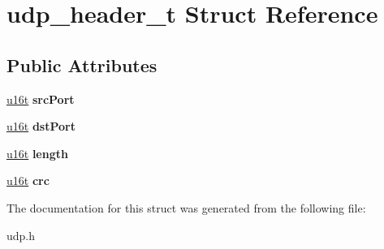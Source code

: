 \hypertarget{structudp__header__t}{}\section{udp\+\_\+header\+\_\+t Struct Reference}
\label{structudp__header__t}
\subsection*{Public Attributes}
\begin{DoxyCompactItemize}
\item 
\mbox{\label{structudp__header__t_a75c64ae2804e9f789e157e914eef7f59}} 
\hyperlink{macros_8h_a590a9a8f7df8fabfac6573e21da1922d}{u16t} {\bfseries src\+Port}
\item 
\mbox{\label{structudp__header__t_a2bd45c541cea7ceba3a45dd50c06f6a3}} 
\hyperlink{macros_8h_a590a9a8f7df8fabfac6573e21da1922d}{u16t} {\bfseries dst\+Port}
\item 
\mbox{\label{structudp__header__t_a2525804fef03fb73295d27ee6ada737b}} 
\hyperlink{macros_8h_a590a9a8f7df8fabfac6573e21da1922d}{u16t} {\bfseries length}
\item 
\mbox{\label{structudp__header__t_a60927678afdb28e824ce916f8299bd01}} 
\hyperlink{macros_8h_a590a9a8f7df8fabfac6573e21da1922d}{u16t} {\bfseries crc}
\end{DoxyCompactItemize}


The documentation for this struct was generated from the following file\+:\begin{DoxyCompactItemize}
\item 
udp.\+h\end{DoxyCompactItemize}
